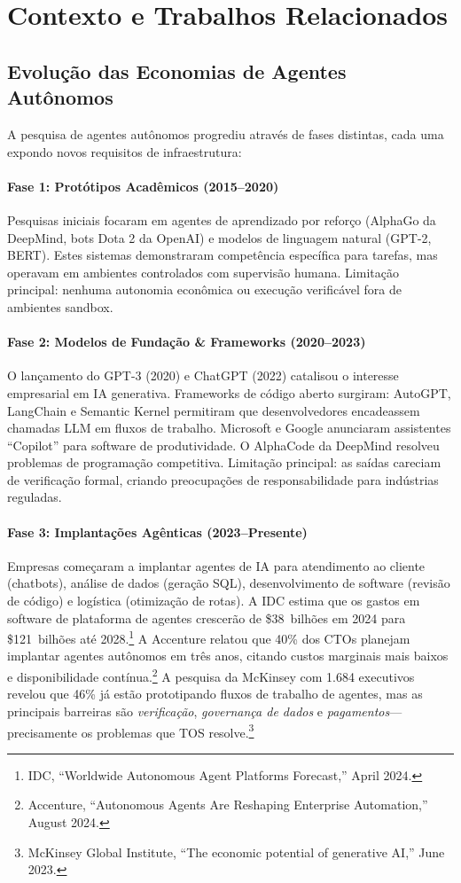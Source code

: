 \documentclass[11pt]{article}
\begin{document}
\section{Contexto e Trabalhos Relacionados}
\subsection{Evolução das Economias de Agentes Autônomos}
A pesquisa de agentes autônomos progrediu através de fases distintas, cada uma expondo novos requisitos de infraestrutura:

\paragraph{Fase 1: Protótipos Acadêmicos (2015--2020)} Pesquisas iniciais focaram em agentes de aprendizado por reforço (AlphaGo da DeepMind, bots Dota 2 da OpenAI) e modelos de linguagem natural (GPT-2, BERT). Estes sistemas demonstraram competência específica para tarefas, mas operavam em ambientes controlados com supervisão humana. Limitação principal: nenhuma autonomia econômica ou execução verificável fora de ambientes sandbox.

\paragraph{Fase 2: Modelos de Fundação \& Frameworks (2020--2023)} O lançamento do GPT-3 (2020) e ChatGPT (2022) catalisou o interesse empresarial em IA generativa. Frameworks de código aberto surgiram: AutoGPT, LangChain e Semantic Kernel permitiram que desenvolvedores encadeassem chamadas LLM em fluxos de trabalho. Microsoft e Google anunciaram assistentes ``Copilot'' para software de produtividade. O AlphaCode da DeepMind resolveu problemas de programação competitiva. Limitação principal: as saídas careciam de verificação formal, criando preocupações de responsabilidade para indústrias reguladas.

\paragraph{Fase 3: Implantações Agênticas (2023--Presente)} Empresas começaram a implantar agentes de IA para atendimento ao cliente (chatbots), análise de dados (geração SQL), desenvolvimento de software (revisão de código) e logística (otimização de rotas). A IDC estima que os gastos em software de plataforma de agentes crescerão de \$38~bilhões em 2024 para \$121~bilhões até 2028.\footnote{IDC, ``Worldwide Autonomous Agent Platforms Forecast,'' April 2024.} A Accenture relatou que 40\% dos CTOs planejam implantar agentes autônomos em três anos, citando custos marginais mais baixos e disponibilidade contínua.\footnote{Accenture, ``Autonomous Agents Are Reshaping Enterprise Automation,'' August 2024.} A pesquisa da McKinsey com 1.684 executivos revelou que 46\% já estão prototipando fluxos de trabalho de agentes, mas as principais barreiras são \emph{verificação}, \emph{governança de dados} e \emph{pagamentos}---precisamente os problemas que TOS resolve.\footnote{McKinsey Global Institute, ``The economic potential of generative AI,'' June 2023.}
\end{document}
